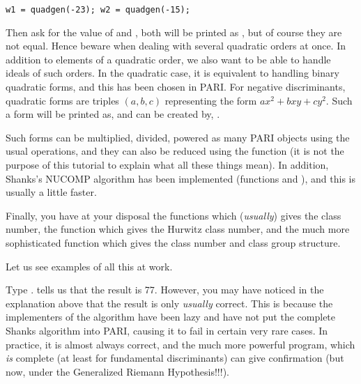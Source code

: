\centerline{\tt w1 = quadgen(-23); w2 = quadgen(-15);}

Then ask for the value of  and , both will be printed as
, but of course they are not equal. Hence beware when dealing with
several quadratic orders at once. \smallskip
%
In addition to elements of a quadratic order, we also want to be able to
handle ideals of such orders. In the quadratic case, it is equivalent to
handling binary quadratic forms, and this has been chosen in PARI. For
negative discriminants, quadratic forms are triples $(a,b,c)$ representing
the form $ax^2+bxy+cy^2$. Such a form will be printed as, and can be created
by, .

Such forms can be multiplied, divided, powered as many PARI objects using
the usual operations, and they can also be reduced using the function
 (it is not the purpose of this tutorial to explain what all
these things mean). In addition, Shanks's NUCOMP algorithm has been
implemented (functions  and ), and this is
usually a little faster.

Finally, you have at your disposal the functions  which
(\emph{usually}) gives the class number, the function 
which gives the Hurwitz class number, and the much more sophisticated
 function which gives the class number and class group
structure.

Let us see examples of all this at work.

Type .  tells us that the result is 77. However,
you may have noticed in the explanation above that the result is only
\emph{usually} correct. This is because the implementers of the algorithm
have been lazy and have not put the complete Shanks algorithm into PARI,
causing it to fail in certain very rare cases. In practice, it is almost
always correct, and the much more powerful  program, which
\emph{is} complete (at least for fundamental discriminants) can give
confirmation (but now, under the Generalized Riemann Hypothesis!!!).

